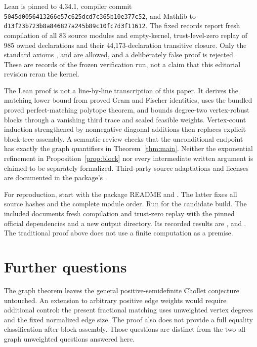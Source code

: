 \documentclass[11pt]{article}
\theoremstyle{remark}\newtheorem{remark}[theorem]{Remark}
\begin{document}
Lean is pinned to 4.34.1, compiler commit
\nolinkurl{5045d0056413266e57c625dcd7c365b10e377c52}, and Mathlib to
\nolinkurl{d13f23b723b8a846827a245b89c10fc7d3f11612}.
The fixed records report fresh compilation of all 83 source modules and
empty-kernel, trust-level-zero replay of 985 owned declarations and
their 44,173-declaration transitive closure. Only the standard axioms
,  and  are
allowed, and a deliberately false proof is rejected.
These are records of the frozen verification run, not a claim that this
editorial revision reran the kernel.

The Lean proof is not a line-by-line transcription of this paper.
It derives the matching lower bound from proved Gram and Fischer
identities, uses the bundled proved perfect-matching polytope theorem,
and bounds degree-two vertex-robust blocks through a vanishing third
trace and scaled feasible weights. Vertex-count induction strengthened
by nonnegative diagonal additions then replaces explicit block-tree
assembly. A semantic review checks that the unconditional endpoint
has exactly the graph quantifiers in Theorem~\ref{thm:main}.
Neither the exponential refinement in Proposition~\ref{prop:block}
nor every intermediate written argument is claimed to be separately
formalized. Third-party source adaptations and licenses are documented
in the package's .

For reproduction, start with the package README and .
The latter fixes all source hashes and the complete module order.
Run  for the candidate build. The included
 documents fresh compilation and trust-zero replay
with the pinned official dependencies and a new output directory.
Its recorded results are ,
 and
. The traditional proof above
does not use a finite computation as a premise.

\section{Further questions}
The graph theorem leaves the general positive-semidefinite Chollet
conjecture untouched. An extension to arbitrary positive edge weights
would require additional control: the present fractional matching uses
unweighted vertex degrees and the fixed normalized edge size. The proof
also does not provide a full equality classification after block assembly.
Those questions are distinct from the two all-graph unweighted questions
answered here.
\end{document}
